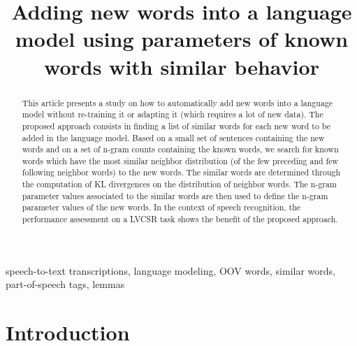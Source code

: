 \documentclass[conference]{IEEEtran}
\begin{document}
\title{Adding new words into a language model using parameters of known words with similar behavior}

\author{
}

\maketitle

\begin{abstract}
This article presents a study on how to automatically add new words into a language model without re-training it or adapting it (which requires a lot of new data).
The proposed approach consists in finding a list of similar words for each new word to be added in the language model.
Based on a small set of sentences containing the new words and on a set of n-gram counts containing the known words, we search for known words which have the most similar neighbor distribution (of the few preceding and few following neighbor words) to the new words. 
The similar words are determined through the computation of KL divergences on the distribution of neighbor words.
The n-gram parameter values associated to the similar words are then used to define the n-gram parameter values of the new words. 
In the context of speech recognition, the performance assessment on a LVCSR task shows the benefit of the proposed approach.
\end{abstract}
\begin{IEEEkeywords}
speech-to-text transcriptions, language modeling, OOV words, similar words, part-of-speech tags, lemmas
\end{IEEEkeywords}


\section{Introduction}
\end{document}
